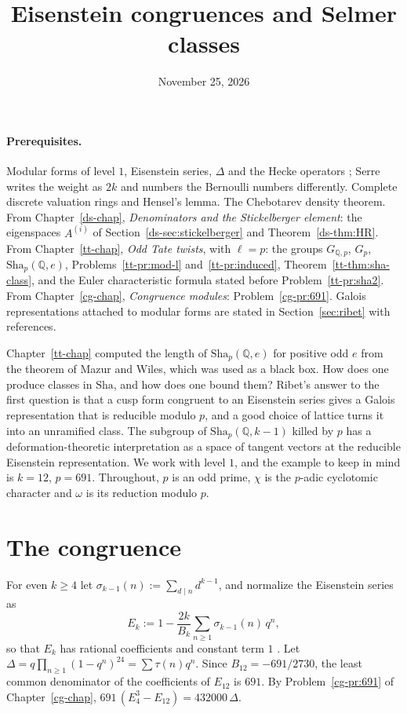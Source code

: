 \documentclass[reqno]{amsart}
\title{Eisenstein congruences and Selmer classes}
\author{}
\date{November 25, 2026}
\newcounter{chap}
\theoremstyle{definition}
\theoremstyle{plain}
\newcommand{\Q}{\mathbb{Q}}
\newcommand{\Sha}{\mathrm{Sha}}
\newcommand{\GQ}{G_{\Q,p}}
\begin{document}
\maketitle
{}\label{chap}

\paragraph{Prerequisites.}
Modular forms of level \(1\), Eisenstein series, \(\Delta\) and the Hecke operators \cite[Ch.~VII]{SeA}; Serre writes the weight as \(2k\) and numbers the Bernoulli numbers differently.  Complete discrete valuation rings and Hensel's lemma.  The Chebotarev density theorem.  From Chapter~\ref{ds-chap}, \emph{Denominators and the Stickelberger element}: the eigenspaces \(A^{(i)}\) of Section~\ref{ds-sec:stickelberger} and Theorem~\ref{ds-thm:HR}.  From Chapter~\ref{tt-chap}, \emph{Odd Tate twists}, with \(\ell = p\): the groups \(\GQ\), \(G_p\), \(\Sha_p(\Q, e)\), Problems~\ref{tt-pr:mod-l} and~\ref{tt-pr:induced}, Theorem~\ref{tt-thm:sha-class}, and the Euler characteristic formula stated before Problem~\ref{tt-pr:sha2}.  From Chapter~\ref{cg-chap}, \emph{Congruence modules}: Problem~\ref{cg-pr:691}.  Galois representations attached to modular forms are stated in Section~\ref{sec:ribet} with references.

Chapter~\ref{tt-chap} computed the length of \(\Sha_p(\Q, e)\) for positive odd \(e\) from the theorem of Mazur and Wiles, which was used as a black box.  How does one produce classes in \(\Sha\), and how does one bound them?  Ribet's answer to the first question \cite{Ri} is that a cusp form congruent to an Eisenstein series gives a Galois representation that is reducible modulo \(p\), and a good choice of lattice turns it into an unramified class.  The subgroup of \(\Sha_p(\Q,k-1)\) killed by \(p\) has a deformation-theoretic interpretation as a space of tangent vectors at the reducible Eisenstein representation.  We work with level \(1\), and the example to keep in mind is \(k = 12\), \(p = 691\).  Throughout, \(p\) is an odd prime, \(\chi\) is the \(p\)-adic cyclotomic character and \(\omega\) is its reduction modulo \(p\).

\section{The congruence}\label{sec:congruence}

For even \(k \ge 4\) let \(\sigma_{k-1}(n) := \sum_{d \mid n} d^{k-1}\), and normalize the Eisenstein series as
\[
  E_k := 1 - \frac{2k}{B_k} \sum_{n \ge 1} \sigma_{k-1}(n)\, q^n ,
\]
so that \(E_k\) has rational coefficients and constant term \(1\) \cite[Ch.~VII, \S4]{SeA}.  Let \(\Delta = q\prod_{n\ge1}(1-q^n)^{24} = \sum \tau(n) q^n\).  Since \(B_{12} = -691/2730\), the least common denominator of the coefficients of \(E_{12}\) is \(691\).  By Problem~\ref{cg-pr:691} of Chapter~\ref{cg-chap}, \(691\,(E_4^3 - E_{12}) = 432000\,\Delta\).
\end{document}
